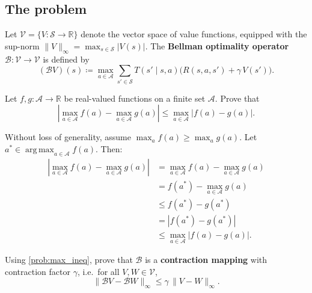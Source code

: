 \documentclass[11pt]{article}
\newcommand{\cS}{\mathcal{S}}
\newcommand{\cA}{\mathcal{A}}
\DeclareMathOperator*{\argmax}{arg\,max}
\begin{document}
\subsection*{The problem}

\begin{definition}\label{def:bellman_op}
Let $\mathcal{V} = \{V : \cS \to \mathbb{R}\}$ denote the vector space of value functions, equipped with the sup-norm
$\|V\|_\infty = \max_{s \in \cS} |V(s)|$.
The \textbf{Bellman optimality operator} $\mathcal{B} : \mathcal{V} \to \mathcal{V}$ is defined by
$$
(\mathcal{B} V)(s) \coloneqq \max_{a \in \cA} \sum_{s' \in \cS} T(s' \mid s, a)\bigl(R(s,a,s') + \gamma\, V(s')\bigr).
$$
\end{definition}

\begin{exercise}
\label{prob:max_ineq} Let $f, g : \cA \to \mathbb{R}$ be real-valued functions on a finite set $\cA$. Prove that
$$
\left|\max_{a \in \cA} f(a) - \max_{a \in \cA} g(a)\right| \le \max_{a \in \cA} |f(a) - g(a)|.
$$
\end{exercise}

\begin{solution}
Without loss of generality, assume $\max_{a} f(a) \ge \max_{a} g(a)$. Let $a^* \in \argmax_{a \in \cA} f(a)$. Then:
\begin{align*}
\left|\max_{a \in \cA} f(a) - \max_{a \in \cA} g(a)\right| &= \max_{a \in \cA} f(a) - \max_{a \in \cA} g(a) \\
&= f(a^*) - \max_{a \in \cA} g(a) \\
&\le f(a^*) - g(a^*) \\
& = |f(a^*) - g(a^*)| \\
&\le \max_{a \in \cA} |f(a) - g(a)|.
\end{align*}
\end{solution}

\begin{exercise}
\label{prob:B_contraction} Using \cref{prob:max_ineq}, prove that $\mathcal{B}$ is a \textbf{contraction mapping} with contraction factor $\gamma$, i.e.\ for all $V, W \in \mathcal{V}$,
$$
\|\mathcal{B} V - \mathcal{B} W\|_\infty \le \gamma\, \|V - W\|_\infty.
$$
\end{exercise}
\end{document}
